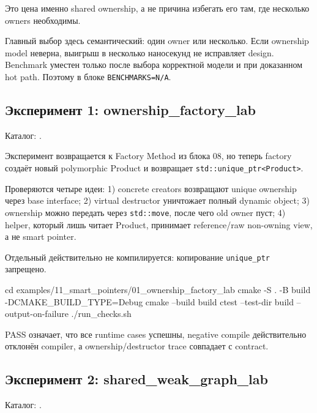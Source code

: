 Это цена именно shared ownership, а не причина избегать его там, где несколько
owners необходимы.

\begin{performancebox}
Главный выбор здесь семантический: один owner или несколько. Если ownership
model неверна, выигрыш в несколько наносекунд не исправляет design. Benchmark
уместен только после выбора корректной модели и при доказанном hot path.
Поэтому в блоке \texttt{BENCHMARKS=N/A}.
\end{performancebox}

\subsection{Эксперимент 1: ownership\_factory\_lab}

Каталог:
.

Эксперимент возвращается к Factory Method из блока 08, но теперь factory
создаёт новый polymorphic Product и возвращает
\texttt{std::unique\_ptr<Product>}.

Проверяются четыре идеи:
1) concrete creators возвращают unique ownership через base interface; 2) virtual destructor уничтожает полный dynamic object; 3) ownership можно передать через \texttt{std::move}, после чего old owner пуст; 4) helper, который лишь читает Product, принимает reference/raw non-owning view, а не smart pointer.

Отдельный  действительно не компилируется:
копирование \texttt{unique\_ptr} запрещено.

\begin{shellcode}
cd examples/11_smart_pointers/01_ownership_factory_lab
cmake -S . -B build -DCMAKE_BUILD_TYPE=Debug
cmake --build build
ctest --test-dir build --output-on-failure
./run_checks.sh
\end{shellcode}

PASS означает, что все runtime cases успешны, negative compile действительно
отклонён compiler, а ownership/destructor trace совпадает с contract.

\subsection{Эксперимент 2: shared\_weak\_graph\_lab}

Каталог:
.

